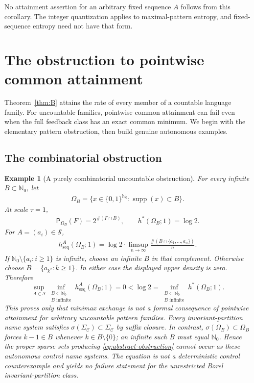 \documentclass[11pt,reqno]{amsart}
\numberwithin{equation}{section}
\newtheorem{example}[theorem]{Example}
\theoremstyle{definition}
\newcommand{\Nzero}{\mathbb N_0}
\newcommand{\C}{\mathcal C}
\newcommand{\Patt}{\mathsf P}
\newcommand{\hseq}{h_{\mathrm{seq}}}
\newcommand{\hpat}{h^{*}}
\newcommand{\supp}{\operatorname{supp}}
\begin{document}
No attainment assertion for an arbitrary fixed sequence $A$ follows
from this corollary. The integer quantization applies to maximal-pattern
entropy, and fixed-sequence entropy need not have that form.

\section{The obstruction to pointwise common attainment}
\label{app:pointwise}

Theorem~\ref{thm:B} attains the rate of every member of a countable
language family. For uncountable families, pointwise common
attainment can fail even when the full feedback class has an exact
common minimum. We begin with the elementary pattern obstruction,
then build genuine autonomous examples.

\subsection{The combinatorial obstruction}

\begin{example}[A purely combinatorial uncountable obstruction]
\label{ex:uncountable}
For every infinite $B\subset\Nzero$, let
\begin{align*}
 \Omega_B=\{x\in\{0,1\}^{\Nzero}:\supp(x)\subset B\}.
\end{align*}
At scale $\tau=1$,
\begin{align*}
 \Patt_{\Omega_B}(F)=2^{\#(F\cap B)},
 \qquad \hpat(\Omega_B;1)=\log2.
\end{align*}
For $A=(a_i)\in\mathscr S$,
\begin{align*}
 \hseq^A(\Omega_B;1)
 =\log2\cdot\limsup_{n\to\infty}
 \frac{\#(B\cap\{a_1,\ldots,a_n\})}{n}.
\end{align*}
If $\Nzero\setminus\{a_i:i\ge1\}$ is infinite, choose an infinite $B$ in that
complement.  Otherwise choose $B=\{a_{k^2}:k\ge1\}$.  In either case the
displayed upper density is zero.  Therefore
\begin{equation}\label{eq:abstract-obstruction}
 \sup_{A\in\mathscr S}
 \inf_{\substack{B\subset\Nzero\\B\text{ infinite}}}
 \hseq^A(\Omega_B;1)=0
 <\log2
 =\inf_{\substack{B\subset\Nzero\\B\text{ infinite}}}
 \hpat(\Omega_B;1).
\end{equation}
This proves only that minimax exchange is not a formal consequence of
pointwise attainment for arbitrary uncountable pattern families.  Every
invariant-partition name system satisfies
$\sigma(\Sigma_\C)\subset\Sigma_\C$ by suffix closure.  In contrast,
$\sigma(\Omega_B)\subset\Omega_B$ forces $k-1\in B$ whenever
$k\in B\setminus\{0\}$; an infinite such $B$ must equal $\Nzero$.  Hence the
proper sparse sets producing \eqref{eq:abstract-obstruction} cannot occur as
these autonomous control name systems.  The equation is not a deterministic
control counterexample and yields no failure statement for the unrestricted
Borel invariant-partition class.
\end{example}
\end{document}
